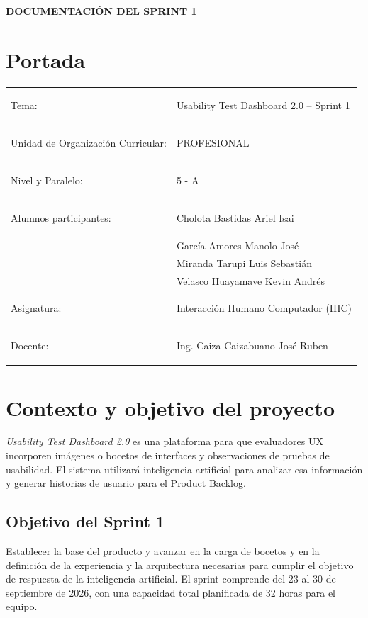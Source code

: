 \documentclass[12pt,a4paper]{article}
\begin{document}
\thispagestyle{fancy}
\begin{center}
    {\Large\bfseries DOCUMENTACIÓN DEL SPRINT 1\par}
\end{center}

\section{Portada}

\begin{tabularx}{\textwidth}{@{}>{\bfseries\raggedright\arraybackslash}p{6.2cm}X@{}}
    Tema: & Usability Test Dashboard 2.0 -- Sprint 1 \\
    Unidad de Organización Curricular: & PROFESIONAL \\
    Nivel y Paralelo: & 5 - A \\
    Alumnos participantes: &  Cholota Bastidas Ariel Isai \\
                                             & García Amores Manolo José \\
                                             & Miranda Tarupi Luis Sebastián \\
                                             & Velasco Huayamave Kevin Andrés \\
    Asignatura: & Interacción Humano Computador (IHC) \\
    Docente: & Ing. Caiza Caizabuano José Ruben\\
\end{tabularx}

\vspace{1cm}
\tableofcontents
\clearpage
{}

\section{Contexto y objetivo del proyecto}

\textit{Usability Test Dashboard 2.0} es una plataforma para que evaluadores UX
incorporen imágenes o bocetos de interfaces y observaciones de pruebas de usabilidad.
El sistema utilizará inteligencia artificial para analizar esa información y generar
historias de usuario para el Product Backlog.

\subsection{Objetivo del Sprint 1}

Establecer la base del producto y avanzar en la carga de bocetos y en la definición
de la experiencia y la arquitectura necesarias para cumplir el objetivo de respuesta
de la inteligencia artificial. El sprint comprende del 23 al 30 de septiembre de 2026,
con una capacidad total planificada de 32 horas para el equipo.
\end{document}
